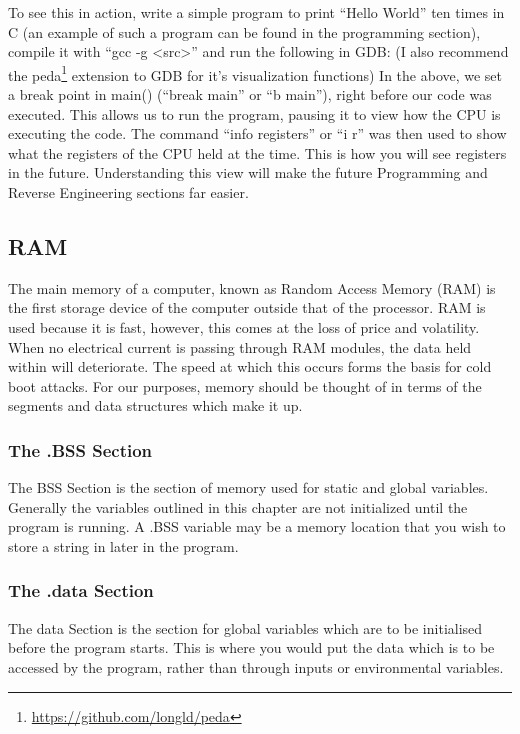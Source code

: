 				To see this in action, write a simple program to print ``Hello World'' ten times in C (an example of such a program can be found in the programming section), %
				compile it with ``gcc -g <src>'' and run the following in GDB: (I also recommend the peda\footnote{\url{https://github.com/longld/peda}} extension to GDB for it's visualization functions)
				In the above, we set a break point in main() (``break main'' or ``b main''), right before our code was executed.
				This allows us to run the program, pausing it to view how the CPU is executing the code.
				The command ``info registers'' or ``i r'' was then used to show what the registers of the CPU held at the time.
				This is how you will see registers in the future.
				Understanding this view will make the future Programming and Reverse Engineering sections far easier. %



				\subsection{RAM}
					The main memory of a computer, known as Random Access Memory (RAM) is the first storage device of the computer outside that of the processor.
					RAM is used because it is fast, however, this comes at the loss of price and volatility.
					When no electrical current is passing through RAM modules, the data held within will deteriorate.
					The speed at which this occurs forms the basis for cold boot attacks. %
					For our purposes, memory should be thought of in terms of the segments and data structures which make it up.
					\subsubsection{The .BSS Section}
						The BSS Section is the section of memory used for static and global variables.
						Generally the variables outlined in this chapter are not initialized until the program is running.
						A .BSS variable may be a memory location that you wish to store a string in later in the program.
					\subsubsection{The .data Section}
						The data Section is the section for global variables which are to be initialised before the program starts.
						This is where you would put the data which is to be accessed by the program, rather than through inputs or environmental variables.
